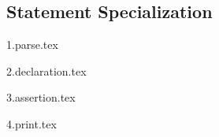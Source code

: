 
\subsection{Statement Specialization}
{
	\lipsum[1]
	
	{1.parse.tex}
	
	{2.declaration.tex}
	
	{3.assertion.tex}
	
	{4.print.tex}
}
